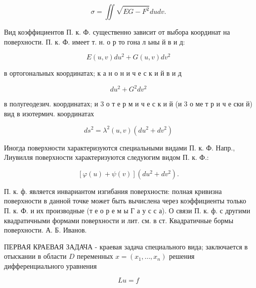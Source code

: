 \documentclass[10pt]{article}
\begin{document}
\[

\sigma=\iint \sqrt{E G-F^{2}} d u d v .

\]



Вид коэффициентов П. к. Ф. существенно зависит от выбора координат на поверхности. П. к. Ф. имеет т. н. о р то гона л ьны й в и д:



\[

E(u, v) d u^{2}+G(u, v) d v^{2}

\]



в ортогональных координатах; к а н о н и ч е с к и й в и д



\[

d u^{2}+G^{2} d v^{2}

\]



в полугеодезич. координатах; и 3 о т е р м и ч е с к и й (и 3 о ме т р и ч е ски й) вид в изотермич. координатах



\[

d s^{2}=\lambda^{2}(u, v)\left(d u^{2}+d v^{2}\right)

\]



Иногда поверхности характеризуются специальными видами П. к. Ф. Напр., Лиувилля поверхности характеризуются следуюгим видом П. к. Ф.:



\[

[\varphi(u)+\psi(v)]\left(d u^{2}+d v^{2}\right) .

\]



П. к. ф. является инвариантом изгибания поверхности: полная кривизна поверхности в данной точке может быть вычислена через коэффициенты только П. к. Ф. и их производные (т е о р е м ы $Г$ а у с с а). О связи П. к. ф. с другими квадратичными формами поверхности и лит. см. в ст. Квадратичные бормы поверхности. А. Б. Иванов.



ПЕРВАЯ КРАЕВАЯ ЗАДАЧА - краевая задача специального вида; заключается в отыскании в области $D$ переменных $x=\left(x_{1}, \ldots, x_{n}\right)$ решения дифференциального уравнения



\[

L u=f

\]
\end{document}
